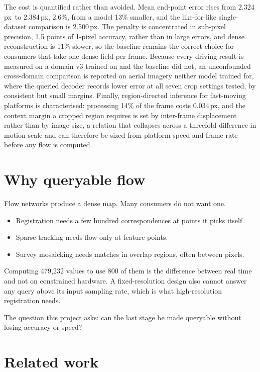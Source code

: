\documentclass[11pt,a4paper]{article}
\newcommand{\px}{\,px}
\begin{document}
The cost is quantified rather than avoided. Mean end-point error rises from
2.324\px\ to 2.384\px, 2.6\%, from a model 13\% smaller, and the like-for-like
single-dataset comparison is 2.500\px. The penalty is concentrated in sub-pixel
precision, 1.5 points of 1-pixel accuracy, rather than in large errors, and dense
reconstruction is 11\% slower, so the baseline remains the correct choice for
consumers that take one dense field per frame. Because every driving result is
measured on a domain v3 trained on and the baseline did not, an unconfounded
cross-domain comparison is reported on aerial imagery neither model trained for,
where the queried decoder records lower error at all seven crop settings tested,
by consistent but small margins. Finally, region-directed inference for
fast-moving platforms is characterised: processing 14\% of the frame costs
0.034\px, and the context margin a cropped region requires is set by inter-frame
displacement rather than by image size, a relation that collapses across a
threefold difference in motion scale and can therefore be sized from platform
speed and frame rate before any flow is computed.

\section{Why queryable flow}
Flow networks produce a dense map. Many consumers do not want one.

\begin{itemize}
\item Registration needs a few hundred correspondences at points it picks itself.
\item Sparse tracking needs flow only at feature points.
\item Survey mosaicking needs matches in overlap regions, often between pixels.
\end{itemize}

Computing 479{,}232 values to use 800 of them is the difference between real time
and not on constrained hardware. A fixed-resolution design also cannot answer any
query above its input sampling rate, which is what high-resolution registration
needs.

The question this project asks: can the last stage be made queryable without
losing accuracy or speed?

\section{Related work}
\label{sec:related}
\end{document}
